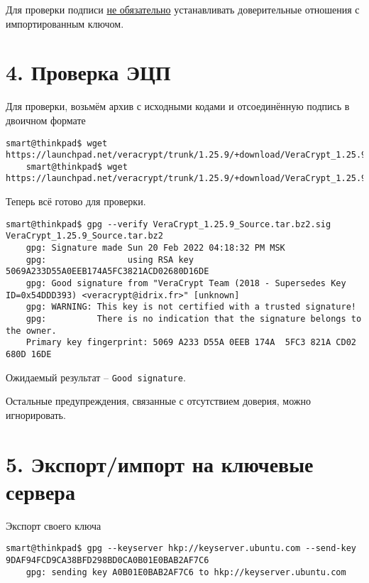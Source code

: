Для проверки подписи \underline{не обязательно} устанавливать доверительные отношения с импортированным ключом.

\section*{4. Проверка ЭЦП}

Для проверки, возьмём архив с исходными кодами и отсоединённую подпись в двоичном формате
\begin{Verbatim}[frame=single]
    smart@thinkpad$ wget https://launchpad.net/veracrypt/trunk/1.25.9/+download/VeraCrypt_1.25.9_Source.tar.bz2
    smart@thinkpad$ wget https://launchpad.net/veracrypt/trunk/1.25.9/+download/VeraCrypt_1.25.9_Source.tar.bz2.sig
\end{Verbatim}

Теперь всё готово для проверки.
\begin{Verbatim}[frame=single]
    smart@thinkpad$ gpg --verify VeraCrypt_1.25.9_Source.tar.bz2.sig VeraCrypt_1.25.9_Source.tar.bz2
    gpg: Signature made Sun 20 Feb 2022 04:18:32 PM MSK
    gpg:                using RSA key 5069A233D55A0EEB174A5FC3821ACD02680D16DE
    gpg: Good signature from "VeraCrypt Team (2018 - Supersedes Key ID=0x54DDD393) <veracrypt@idrix.fr>" [unknown]
    gpg: WARNING: This key is not certified with a trusted signature!
    gpg:          There is no indication that the signature belongs to the owner.
    Primary key fingerprint: 5069 A233 D55A 0EEB 174A  5FC3 821A CD02 680D 16DE
\end{Verbatim}

Ожидаемый результат -- \texttt{Good signature}.

Остальные предупреждения, связанные с отсутствием доверия, можно игнорировать.

\section*{5. Экспорт/импорт на ключевые сервера}

Экспорт своего ключа
\begin{Verbatim}[frame=single]
    smart@thinkpad$ gpg --keyserver hkp://keyserver.ubuntu.com --send-key 9DAF94FCD9CA38BFD298BD0CA0B01E0BAB2AF7C6
    gpg: sending key A0B01E0BAB2AF7C6 to hkp://keyserver.ubuntu.com
\end{Verbatim}

